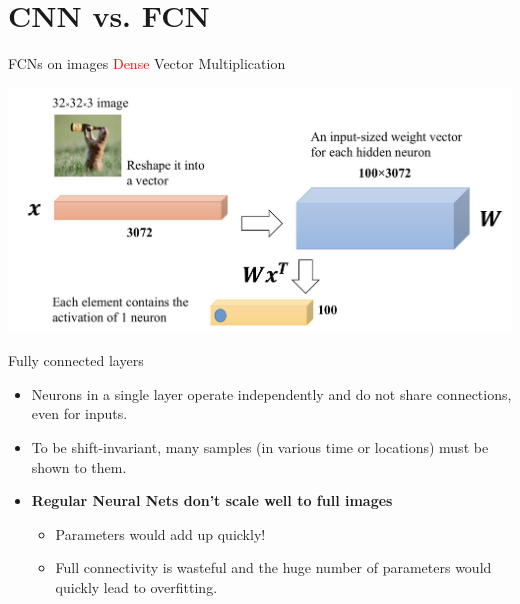 \documentclass[default, aspectratio=169]{beamer}
\begin{document}
	
	
	\section{CNN vs. FCN}
	\begin{frame}{FCNs on images}
		\textcolor{red}{Dense} Vector Multiplication
		\begin{center}
			\includegraphics[keepaspectratio, scale=0.2]{pic/Processing images.jpg}
		\end{center}
	\end{frame}
	\begin{frame}{Fully connected layers}
		\begin{itemize}
			\item Neurons in a single layer operate independently and do not share connections, even for inputs.
			
			\bigskip
			
			\item To be shift-invariant, many samples (in various time or locations) must be shown to them.
			
			\bigskip
			
			\item \textbf{Regular Neural Nets don’t scale well to full images}
			\begin{itemize}
				\item Parameters would add up quickly!
				\item Full connectivity is wasteful and the huge number of parameters would quickly lead to overfitting.
			\end{itemize}
		\end{itemize}
	\end{frame}
\end{document}

